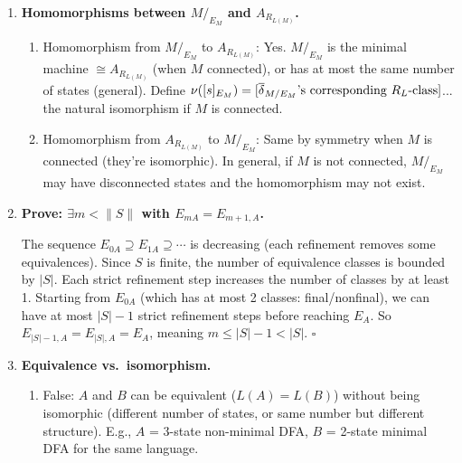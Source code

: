 \begin{enumerate}[{3.}1.]
\begin{enumerate}
\item If $R$ refines $E_A$: then $R$-classes are subsets of $E_A$-classes. $A/_R$ has more states than $A/_{E_A}$. Well-definedness: $\delta_R([s]_R,a)=[\delta(s,a)]_R$. If $s\,R\,t$: then $s\,E_A\,t$ (since $R$ refines $E_A$), so $\delta(s,a)\,E_A\,\delta(t,a)$. But does $\delta(s,a)\,R\,\delta(t,a)$? Not necessarily. So $A/_R$ is well-defined only if $R$ is itself a right congruence on states (i.e., $s\,R\,t\Rightarrow\delta(s,a)\,R\,\delta(t,a)$), which $E_A$ satisfies but a finer $R$ may not.
\end{enumerate}

\item \textbf{Homomorphisms between $M/_{E_M}$ and $A_{R_{L(M)}}$.}

\begin{enumerate}
\item Homomorphism from $M/_{E_M}$ to $A_{R_{L(M)}}$: Yes. $M/_{E_M}$ is the minimal machine $\cong A_{R_{L(M)}}$ (when $M$ connected), or has at most the same number of states (general). Define $\nu([s]_{E_M})=[\overline{\delta}_{M/E_M}\text{'s corresponding }R_L\text{-class}]$... the natural isomorphism if $M$ is connected.

\item Homomorphism from $A_{R_{L(M)}}$ to $M/_{E_M}$: Same by symmetry when $M$ is connected (they're isomorphic). In general, if $M$ is not connected, $M/_{E_M}$ may have disconnected states and the homomorphism may not exist.
\end{enumerate}

\item \textbf{Prove: $\exists m<\|S\|$ with $E_{mA}=E_{m+1,A}$.}

The sequence $E_{0A}\supseteq E_{1A}\supseteq\cdots$ is decreasing (each refinement removes some equivalences). Since $S$ is finite, the number of equivalence classes is bounded by $|S|$. Each strict refinement step increases the number of classes by at least 1. Starting from $E_{0A}$ (which has at most 2 classes: final/nonfinal), we can have at most $|S|-1$ strict refinement steps before reaching $E_A$. So $E_{|S|-1,A}=E_{|S|,A}=E_A$, meaning $m\leq|S|-1<|S|$. $\square$

\item \textbf{Equivalence vs.\ isomorphism.}

\begin{enumerate}
\item False: $A$ and $B$ can be equivalent ($L(A)=L(B)$) without being isomorphic (different number of states, or same number but different structure). E.g., $A$ = 3-state non-minimal DFA, $B$ = 2-state minimal DFA for the same language.


\end{enumerate}
\end{enumerate}
